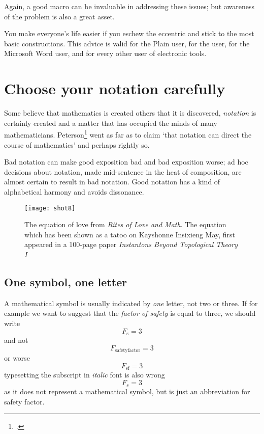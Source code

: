 {Again, a good macro can be invaluable in addressing these issues; but
awareness of the problem is also a great asset.

\begin{latexquotation}
You make everyone's
life easier if you eschew the eccentric and stick to the most basic constructions. This advice is valid for the Plain \tex user, for the \latex
user, for the Microsoft Word user, and for every other user of electronic
tools.
\end{latexquotation}



\section{Choose your notation carefully}

Some believe that mathematics is created others that it is discovered, \emph{notation} is certainly created and
a matter that has occupied the minds of many mathematicians. Peterson\footcite{peterson2009} \citeyearpar{peterson2009}  went as far as to claim  `that notation can direct the course of mathematics’ and perhaps rightly so.

Bad notation can make good exposition bad and bad exposition worse; ad hoc decisions about notation, made mid-sentence in the heat of composition, are almost certain to result in bad notation. Good notation has a kind of alphabetical harmony and avoids dissonance.

\begin{figure}[htbp]
\texttt{[image: shot8]}
\caption{The equation of love from \emph{Rites of Love and Math}. The equation which has been shown as a tatoo  on Kayshonne Insixieng May, first appeared in a 100-page paper \emph{Instantons Beyond Topological Theory I} \cite{frenkel2012,FLN}}
\end{figure}


\subsection{One symbol, one letter}

A mathematical symbol is usually indicated by \emph{one} letter, not two or three. If for example we want to suggest that the \textit{factor of safety} is equal to three, we should write
\[F_{\mathrm{s}}=3\]
and not
\[F_{\mathrm{safetyfactor}}=3\]
or worse
\[F_{\mathrm{sf}}=3\]
typesetting the subscript in \textit{italic} font is also wrong
\[F_{s}=3\]
as it does not represent a mathematical symbol, but is just an abbreviation for safety factor.

}
